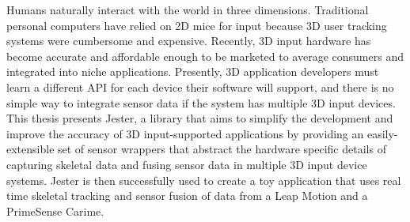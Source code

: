 Humans naturally interact with the world in three dimensions. Traditional personal computers have relied on 2D mice for input because 3D user tracking systems were cumbersome and expensive. Recently, 3D input hardware has become accurate and affordable enough to be marketed to average consumers and integrated into niche applications. Presently, 3D application developers must learn a different API for each device their software will support, and there is no simple way to integrate sensor data if the system has multiple 3D input devices. This thesis presents Jester, a library that aims to simplify the development and improve the accuracy of 3D input-supported applications by providing an easily-extensible set of sensor wrappers that abstract the hardware specific details of capturing skeletal data and fusing sensor data in multiple 3D input device systems. Jester is then successfully used to create a toy application that uses real time skeletal tracking and sensor fusion of data from a Leap Motion and a PrimeSense Carime.